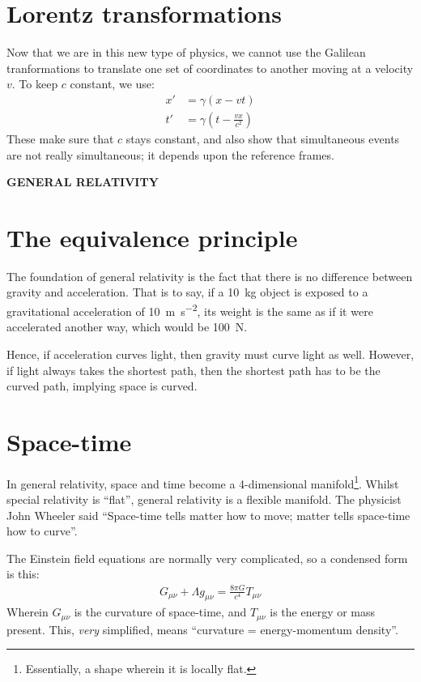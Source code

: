 \documentclass[10pt]{article}
\begin{document}
\section{Lorentz transformations}

Now that we are in this new type of physics, we cannot use the Galilean tranformations to translate one set of coordinates to another moving at a velocity \(v\). To keep \(c\) constant, we use:
\begin{align}
    x' &= \gamma(x - vt)\\
    t' &= \gamma\left(t - \frac{vx}{c^2}\right)
\end{align}
These make sure that \(c\) stays constant, and also show that simultaneous events are not really simultaneous; it depends upon the reference frames.

\newpage

\begin{center}
{\Huge \textbf{GENERAL RELATIVITY}}
\end{center}

\section{The equivalence principle}

The foundation of general relativity is the fact that there is no difference between gravity and acceleration. That is to say, if a \qty{10}{\kilogram} object is exposed to a gravitational acceleration of \qty{10}{\metre\per\second\squared}, its weight is the same as if it were accelerated another way, which would be \qty{100}{\newton}.

Hence, if acceleration curves light, then gravity must curve light as well. However, if light always takes the shortest path, then the shortest path has to be the curved path, implying space is curved.

\section{Space-time}

In general relativity, space and time become a 4-dimensional manifold\footnote{Essentially, a shape wherein it is locally flat.}. Whilst special relativity is \enquote{flat}, general relativity is a flexible manifold. The physicist John Wheeler said \enquote{Space-time tells matter how to move; matter tells space-time how to curve}.

The Einstein field equations are normally very complicated, so a condensed form is this:
\begin{align}
    G_{\mu\nu} + \Lambda g_{\mu\nu} = \frac{8\pi G}{c^4} T_{\mu\nu}
\end{align}
Wherein \(G_{\mu\nu}\) is the curvature of space-time, and \(T_{\mu\nu}\) is the energy or mass present. This, \emph{very} simplified, means \enquote{curvature = energy-momentum density}.
\end{document}
